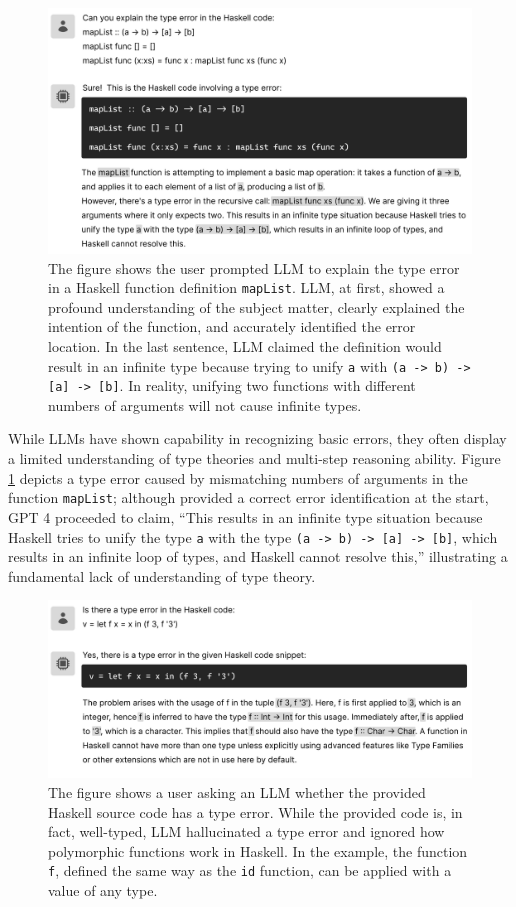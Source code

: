 \begin{figure}[hbt]
  \includegraphics[width=\linewidth]{LLM}
  \caption{\label{fig:llm}
  The figure shows the user prompted LLM to explain the type error in a Haskell function definition \texttt{mapList}. LLM, at first, showed a profound understanding of the subject matter, clearly explained the intention of the function, and accurately identified the error location. In the last sentence, LLM claimed the definition would result in an infinite type because trying to unify \texttt{a} with \texttt{(a -> b) -> [a] -> [b]}. In reality, unifying two functions with different numbers of arguments will not cause infinite types. 
    }
\end{figure}

While LLMs have shown capability in recognizing basic errors, they often display a limited understanding of type theories and multi-step reasoning ability. Figure \ref{fig:llm} depicts a type error caused by mismatching numbers of arguments in the function \texttt{mapList}; although provided a correct error identification at the start, GPT 4 proceeded to claim, “This results in an infinite type situation because Haskell tries to unify the type \texttt{a} with the type \texttt{(a -> b) -> [a] -> [b]}, which results in an infinite loop of types, and Haskell cannot resolve this,” illustrating a fundamental lack of understanding of type theory.

\begin{figure}[hbt]
  \includegraphics[width=\linewidth]{LLM2}
  \caption{\label{fig:llm2}
  The figure shows a user asking an LLM whether the provided Haskell source code has a type error. While the provided code is, in fact, well-typed, LLM hallucinated a type error and ignored how polymorphic functions work in Haskell. In the example, the function \texttt{f},  defined the same way as the \texttt{id} function, can be applied with a value of any type.
    } 
\end{figure}

